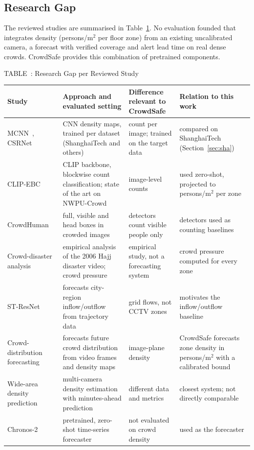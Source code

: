 \documentclass[conference]{IEEEtran}
\newcommand{\pmsq}{persons/m$^2$}
\newcommand{\CStabcap}[2]{\refstepcounter{table}\label{#2}{\centering\footnotesize TABLE~\thetable: #1\par}\vspace{4pt}}
\begin{document}
\subsection{Research Gap}
The reviewed studies are summarised in Table~\ref{tab:gap}. No evaluation founded that integrates density (\pmsq{} per floor zone) from an existing uncalibrated camera, a forecast with verified coverage and alert lead time on real dense crowds. CrowdSafe provides this combination of pretrained components.

\begin{table}[!t]
\CStabcap{Research Gap per Reviewed Study}{tab:gap}
\centering
\scriptsize
\setlength{\tabcolsep}{4pt}
\renewcommand{\arraystretch}{1.1}
\begin{tabular}{@{}p{2.4cm}p{4.5cm}p{4.5cm}p{5.0cm}@{}}
\toprule
Study & Approach and evaluated setting & Difference relevant to CrowdSafe & Relation to this work \\
\midrule
MCNN~\cite{zhang2016mcnn}, CSRNet~\cite{li2018csrnet} & CNN density maps, trained per dataset (ShanghaiTech and others) & count per image; trained on the target data & compared on ShanghaiTech (Section~\ref{sec:sha}) \\
CLIP-EBC~\cite{ma2025clipebc} & CLIP backbone, blockwise count classification; state of the art on NWPU-Crowd & image-level counts & used zero-shot, projected to \pmsq{} per zone \\
CrowdHuman~\cite{shao2018crowdhuman} & full, visible and head boxes in crowded images & detectors count visible people only & detectors used as counting baselines \\
Crowd-disaster analysis~\cite{helbing2007} & empirical analysis of the 2006 Hajj disaster video; crowd pressure & empirical study, not a forecasting system & crowd pressure computed for every zone \\
ST-ResNet~\cite{zhang2017stresnet} & forecasts city-region inflow/outflow from trajectory data & grid flows, not CCTV zones & motivates the inflow/outflow baseline \\
Crowd-distribution forecasting~\cite{niu2020overcrowdedness} & forecasts future crowd distribution from video frames and density maps & image-plane density & CrowdSafe forecasts zone density in \pmsq{} with a calibrated bound \\
Wide-area density prediction~\cite{cao2013video} & multi-camera density estimation with minutes-ahead prediction & different data and metrics & closest system; not directly comparable \\
Chronos-2~\cite{ansari2025chronos2} & pretrained, zero-shot time-series forecaster & not evaluated on crowd density & used as the forecaster \\
\bottomrule
\end{tabular}
\end{table}
\end{document}
